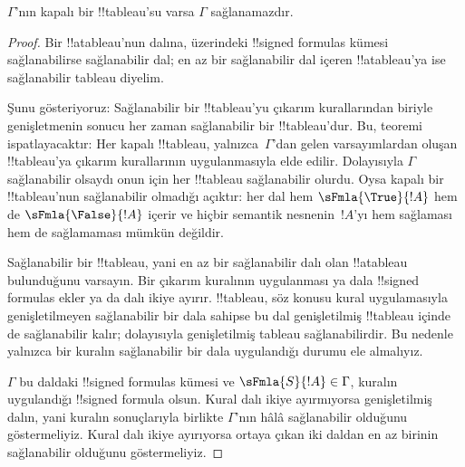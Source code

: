 \documentclass[../../../include/open-logic-section]{subfiles}
\begin{document}
\begin{thm}[Sağlamlık]
  $\Gamma$'nın kapalı bir !!{tableau}'su varsa $\Gamma$ sağlanamazdır.
\end{thm}

\begin{proof}
Bir !!a{tableau}'nun dalına, üzerindeki !!{signed formula}s kümesi
sağlanabilirse sağlanabilir dal; en az bir sağlanabilir dal içeren
!!a{tableau}'ya ise sağlanabilir tableau diyelim.

Şunu gösteriyoruz: Sağlanabilir bir !!{tableau}'yu çıkarım kurallarından
biriyle genişletmenin sonucu her zaman sağlanabilir bir !!{tableau}'dur. Bu,
teoremi ispatlayacaktır: Her kapalı !!{tableau}, yalnızca~$\Gamma$'dan gelen
varsayımlardan oluşan !!{tableau}'ya çıkarım kurallarının uygulanmasıyla elde
edilir. Dolayısıyla $\Gamma$ sağlanabilir olsaydı onun için her !!{tableau}
sağlanabilir olurdu. Oysa kapalı bir !!{tableau}'nun sağlanabilir olmadığı
açıktır: her dal hem $\sFmla{\True}{!A}$ hem de $\sFmla{\False}{!A}$ içerir
ve hiçbir semantik nesnenin~$!A$'yı hem sağlaması hem de sağlamaması mümkün değildir.

Sağlanabilir bir !!{tableau}, yani en az bir sağlanabilir dalı olan
!!a{tableau} bulunduğunu varsayın. Bir çıkarım kuralının uygulanması ya dala
!!{signed formula}s ekler ya da dalı ikiye ayırır. !!{tableau}, söz konusu
kural uygulamasıyla genişletilmeyen sağlanabilir bir dala sahipse bu dal
genişletilmiş !!{tableau} içinde de sağlanabilir kalır; dolayısıyla
genişletilmiş tableau sağlanabilirdir. Bu nedenle yalnızca bir kuralın
sağlanabilir bir dala uygulandığı durumu ele almalıyız.

$\Gamma$ bu daldaki !!{signed formula}s kümesi ve
$\sFmla{S}{!A} \in \Gamma$, kuralın uygulandığı !!{signed formula} olsun.
Kural dalı ikiye ayırmıyorsa genişletilmiş dalın, yani kuralın sonuçlarıyla
birlikte $\Gamma$'nın hâlâ sağlanabilir olduğunu göstermeliyiz. Kural dalı
ikiye ayırıyorsa ortaya çıkan iki daldan en az birinin sağlanabilir olduğunu
göstermeliyiz.
  

\end{proof}
\end{document}
